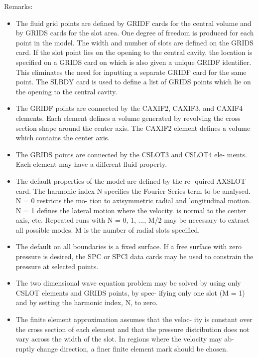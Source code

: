 \documentclass{article}
\begin{document}
Remarks:
\begin{itemize}
    \item The fluid grid points are defined by GRIDF cards for the
        central volume and by GRIDS cards for the slot area. One
        degree of freedom is produced for each point in the model.
        The width and number of slots are defined on the GRIDS card.
        If the slot point lies on the opening to the central cavity,
        the location is specified on a GRIDS card on which is also
        given a unique GRIDF identifier. This eliminates the need
        for inputting a separate GRIDF card for the same point. The
        SLBDY card is used to define a list of GRIDS points which
        lie on the opening to the central cavity. 
    \item The GRIDF points are connected by the CAXIF2, CAXIF3, and
        CAXIF4 elements. Each element defines a volume generated by
        revolving the cross section shape around the center axis.
        The CAXIF2 element defines a volume which contains the center
        axis.
    \item The GRIDS points are connected by the CSLOT3 and CSLOT4 ele-
        ments. Each element may have a different fluid property.
    \item The default properties of the model are defined by the re-
        quired AXSLOT card. The harmonic index N specifies the
        Fourier Series term to be analysed. N = 0 restricts the mo-
        tion to axisymmetric radial and longitudinal motion. N = 1
        defines the lateral motion where the velocity. is normal to
        the center axis, etc. Repeated runs with N = 0, 1, ..., M/2
        may be necessary to extract all possible modes. M is the
        number of radial slots specified.
    \item The default on all boundaries is a fixed surface. If a
        free surface with zero pressure is desired, the SPC or
        SPCl data cards may be used to constrain the pressure at
        selected points.
    \item The two dimensional wave equation problem may be solved
        by using only CSLOT elements and GRIDS points, by spec-
        ifying only one slot (M = 1) and by setting the harmonic
        index, N, to zero.
    \item The finite element approximation assumes that the veloc-
        ity is constant over the cross section of each element and
        that the pressure distribution does not vary across the
        width of the slot. In regions where the velocity may ab-
        ruptly change direction, a finer finite element mark
        should be chosen.
\end{itemize}
\end{document}
